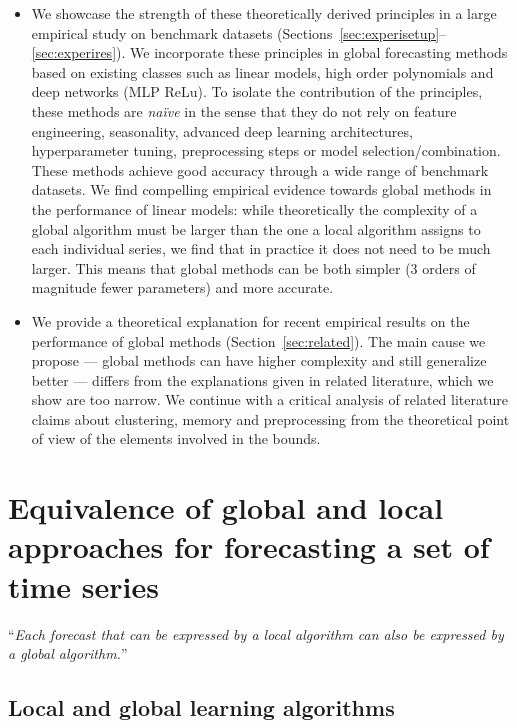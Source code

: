 \documentclass[a4paper]{article}
\theoremstyle{custom}
\begin{document}
\begin{itemize}
\item We showcase the strength of these theoretically derived principles in a large empirical study on benchmark datasets (Sections~\ref{sec:experisetup}--\ref{sec:experires}). We incorporate these principles in global forecasting methods based on existing classes such as linear models, high order polynomials and deep networks (MLP ReLu). To isolate the contribution of the principles, these methods are \textit{naïve} in the sense that they do not rely on feature engineering, seasonality, advanced deep learning architectures, hyperparameter tuning, preprocessing steps or model selection/combination. These methods achieve good accuracy through a wide range of benchmark datasets. We find compelling empirical evidence towards global methods in the performance of linear models: while theoretically the complexity of a global algorithm must be larger than the one a local algorithm assigns to each individual series, we find that in practice it does not need to be much larger.
This means that global methods can be both simpler (3 orders of magnitude fewer parameters) and more accurate.
\item We provide a theoretical explanation for recent empirical results on the performance of global methods (Section~\ref{sec:related}). The main cause we propose --- global methods can have higher complexity and still generalize better --- differs from the explanations given in related literature, which we show are too narrow. We continue with a critical analysis of related literature claims about clustering, memory and preprocessing from the theoretical point of view of the elements involved in the bounds.
\end{itemize}

\section{Equivalence of global and local approaches for forecasting a set of time series}
\label{sec:equivalence}

``\textit{Each forecast that can be expressed by a local algorithm can also be expressed by a global algorithm.}''

\subsection{Local and global learning algorithms}
\end{document}
